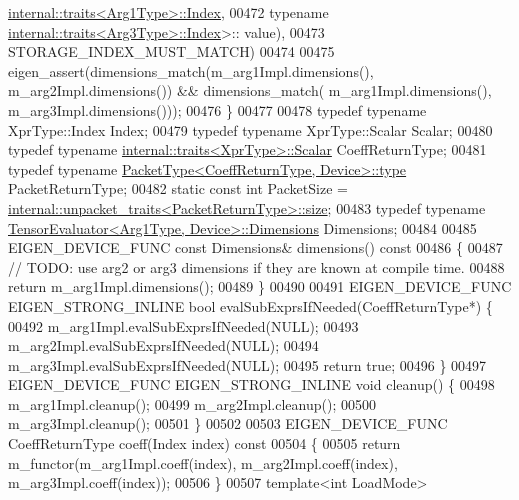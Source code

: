 \begin{DoxyCode}
      \hyperlink{struct_eigen_1_1internal_1_1traits}{internal::traits<Arg1Type>::Index},
00472                          \textcolor{keyword}{typename} \hyperlink{struct_eigen_1_1internal_1_1traits}{internal::traits<Arg3Type>::Index}>::
      value),
00473                         STORAGE\_INDEX\_MUST\_MATCH)
00474 
00475     eigen\_assert(dimensions\_match(m\_arg1Impl.dimensions(), m\_arg2Impl.dimensions()) && dimensions\_match(
      m\_arg1Impl.dimensions(), m\_arg3Impl.dimensions()));
00476   \}
00477 
00478   \textcolor{keyword}{typedef} \textcolor{keyword}{typename} XprType::Index Index;
00479   \textcolor{keyword}{typedef} \textcolor{keyword}{typename} XprType::Scalar Scalar;
00480   \textcolor{keyword}{typedef} \textcolor{keyword}{typename} \hyperlink{struct_eigen_1_1internal_1_1traits}{internal::traits<XprType>::Scalar} CoeffReturnType;
00481   \textcolor{keyword}{typedef} \textcolor{keyword}{typename} \hyperlink{group___sparse_core___module}{PacketType<CoeffReturnType, Device>::type} 
      PacketReturnType;
00482   \textcolor{keyword}{static} \textcolor{keyword}{const} \textcolor{keywordtype}{int} PacketSize = 
      \hyperlink{struct_eigen_1_1internal_1_1unpacket__traits}{internal::unpacket\_traits<PacketReturnType>::size};
00483   \textcolor{keyword}{typedef} \textcolor{keyword}{typename} \hyperlink{struct_eigen_1_1_tensor_evaluator}{TensorEvaluator<Arg1Type, Device>::Dimensions}
       Dimensions;
00484 
00485   EIGEN\_DEVICE\_FUNC \textcolor{keyword}{const} Dimensions& dimensions()\textcolor{keyword}{ const}
00486 \textcolor{keyword}{  }\{
00487     \textcolor{comment}{// TODO: use arg2 or arg3 dimensions if they are known at compile time.}
00488     \textcolor{keywordflow}{return} m\_arg1Impl.dimensions();
00489   \}
00490 
00491   EIGEN\_DEVICE\_FUNC EIGEN\_STRONG\_INLINE \textcolor{keywordtype}{bool} evalSubExprsIfNeeded(CoeffReturnType*) \{
00492     m\_arg1Impl.evalSubExprsIfNeeded(NULL);
00493     m\_arg2Impl.evalSubExprsIfNeeded(NULL);
00494     m\_arg3Impl.evalSubExprsIfNeeded(NULL);
00495     \textcolor{keywordflow}{return} \textcolor{keyword}{true};
00496   \}
00497   EIGEN\_DEVICE\_FUNC EIGEN\_STRONG\_INLINE \textcolor{keywordtype}{void} cleanup() \{
00498     m\_arg1Impl.cleanup();
00499     m\_arg2Impl.cleanup();
00500     m\_arg3Impl.cleanup();
00501   \}
00502 
00503   EIGEN\_DEVICE\_FUNC CoeffReturnType coeff(Index index)\textcolor{keyword}{ const}
00504 \textcolor{keyword}{  }\{
00505     \textcolor{keywordflow}{return} m\_functor(m\_arg1Impl.coeff(index), m\_arg2Impl.coeff(index), m\_arg3Impl.coeff(index));
00506   \}
00507   \textcolor{keyword}{template}<\textcolor{keywordtype}{int} LoadMode>

\end{DoxyCode}
